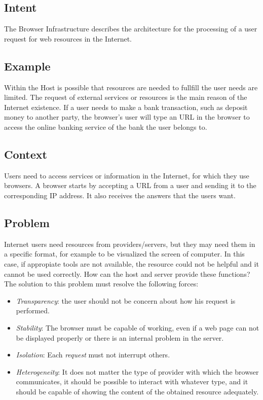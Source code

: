 \documentclass{sig-alternate-05-2015}
\begin{document}
  \subsection*{Intent}

  The Browser Infrastructure describes the architecture for the processing of a user request for web resources in the Internet.

  \subsection*{Example}
  Within the Host is possible that resources are needed to fullfill the user needs are limited. The request of external services or resources is the main reason of the Internet existence. If a user needs to make a bank transaction, such as deposit money to another party, the browser's user will type an URL in the browser to access the online banking service of the bank the user belongs to.
  
  \subsection*{Context}
  Users need to access services or information in the Internet, for which they use browsers. A browser starts by accepting a URL from a user and sending it to the corresponding IP address. It also receives the answers that the users want.

  \subsection*{Problem}
  Internet users need resources from providers/servers, but they may need them in a specific format, for example to be visualized the screen of computer. In this case, if appropiate tools are not available, the resource could not be helpful and it cannot be used correctly. How can the host and server provide these functions? The solution to this problem must resolve the following forces:
  \begin{itemize}
    \item \textit{Transparency}: the user should not be concern about how his request is performed. 
    \item \textit{Stability}: The browser must be capable of working, even if a web page can not be displayed properly or there is an internal problem in the server.
    \item \textit{Isolation}: Each \textit{request} must not interrupt others.
    \item \textit{Heterogeneity}: It does not matter the type of provider with which the browser communicates, it should be possible to interact with whatever type, and it should be capable of showing the content of the obtained resource adequately.
  \end{itemize}
\end{document}
